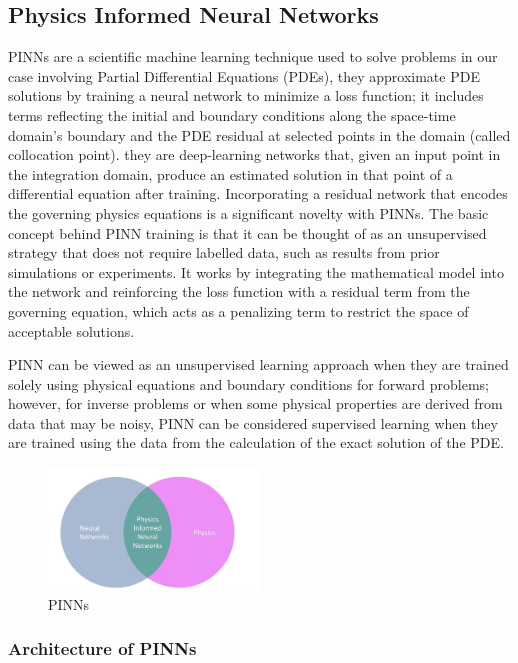 \documentclass{article}
\begin{document}
\subsection{Physics Informed Neural Networks}

PINNs are a scientific machine learning technique used to solve problems in our case involving Partial Differential Equations (PDEs), they approximate PDE solutions by training a neural network to minimize a loss function; it includes terms reflecting the initial and boundary conditions along the space-time domain’s boundary and the PDE residual at selected points in the domain (called collocation point). 
they are deep-learning networks that, given an input point in the integration domain, produce an estimated solution in that point of a differential equation after training. Incorporating a residual network that encodes the governing physics equations is a significant novelty with PINNs. 
The basic concept behind PINN training is that it can be thought of as an unsupervised strategy that does not require labelled data, such as results from prior simulations or experiments.
It works by integrating the mathematical model into the network and reinforcing the loss function with a residual term from the governing equation, which acts as a penalizing term to restrict the space of acceptable solutions.

PINN can be viewed as an unsupervised learning approach when they are trained solely using physical equations and boundary conditions for forward problems; however, for inverse problems or when some physical properties are derived from data that may be noisy, PINN can be considered supervised learning when they are trained using the data from the calculation of the exact solution of the PDE.
\begin{figure}[H]
    \centering
    \includegraphics[width=0.5\textwidth]{images/pinns}
    \caption{PINNs}
\end{figure}


\subsubsection{Architecture of PINNs}
\end{document}
